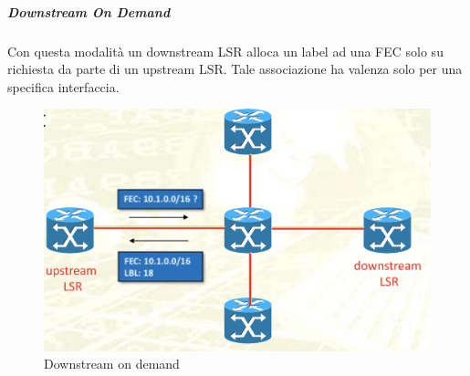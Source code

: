 \documentclass{article}
\begin{document}
\subparagraph{Downstream On Demand} Con questa modalità un downstream LSR alloca un label ad una FEC solo su richiesta da parte di un upstream LSR. Tale associazione ha valenza solo per una specifica interfaccia.
\begin{figure}[H]
    \centering
    \includegraphics[scale=0.3]{figures/downstream on demand.png}
    \caption{Downstream on demand}
\end{figure}
\end{document}
